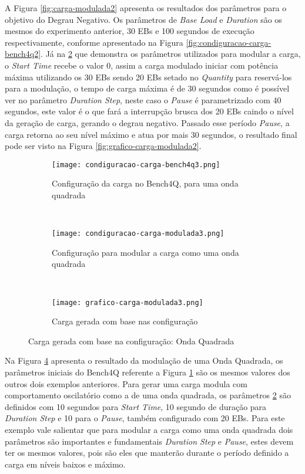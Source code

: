 A Figura \ref{fig:carga-modulada2} apresenta os resultados dos parâmetros para o objetivo do Degrau Negativo. Os parâmetros de \textit{Base Load} e \textit{Duration} são os mesmos do experimento anterior, 30 EBs e 100 segundos de execução respectivamente, conforme apresentado na Figura \ref{fig:condiguracao-carga-bench4q2}. Já na \ref{fig:condiguracao-carga-modulada3} que demonstra os parâmetros utilizados para modular a carga, o \textit{Start Time} recebe o valor 0, assim a carga modulado iniciar com potência máxima utilizando os 30 EBs sendo 20 EBs setado no \textit{Quantity} para reservá-los para a modulação, o tempo de carga máxima é de 30 segundos como é possível ver no parâmetro \textit{Duration Step}, neste caso o \textit{Pause} é parametrizado com 40 segundos, este valor é o que fará a interrupção brusca dos 20 EBs caindo o nível da geração de carga, gerando o degrau negativo. Passado esse período \textit{Pause}, a carga retorna ao seu nível máximo e atua por mais 30 segundos, o resultado final pode ser visto na Figura \ref{fig:grafico-carga-modulada2}. 

\begin{figure}[!htb]
	\begin{subfigure}{\linewidth}
		\centering
		\texttt{[image: condiguracao-carga-bench4q3.png]}
		\caption{Configuração da carga no Bench4Q, para uma onda quadrada}
		\label{fig:condiguracao-carga-bench4q3}
	\end{subfigure}\\
	\begin{subfigure}{\linewidth}
		\centering
		\texttt{[image: condiguracao-carga-modulada3.png]}
		\caption{Configuração para modular a carga como uma onda quadrada}
		\label{fig:condiguracao-carga-modulada3}
	\end{subfigure}\\[1ex]
	\begin{subfigure}{\linewidth}
		\centering
		\texttt{[image: grafico-carga-modulada3.png]}
		\caption{Carga gerada com base nas configuração}
		\label{fig:grafico-carga-modulada3}
	\end{subfigure}
	\caption{Carga gerada com base na configuração: Onda Quadrada}
	\label{fig:carga-modulada3}
	\fautor
\end{figure}

Na Figura \ref{fig:carga-modulada3} apresenta o resultado da modulação de uma Onda Quadrada, os parâmetros iniciais do Bench4Q referente a Figura \ref{fig:condiguracao-carga-bench4q3} são os mesmos valores dos outros dois exemplos anteriores. Para gerar uma carga modula com comportamento oscilatório como a de uma onda quadrada, os parâmetros \ref{fig:condiguracao-carga-modulada3} são definidos com 10 segundos para \textit{Start Time}, 10 segundo de duração para \textit{Duration Step} e 10 para o \textit{Pause}, também configurado com 20 EBs. Para este exemplo vale salientar que para modular a carga como uma onda quadrada dois parâmetros são importantes e fundamentais \textit{Duration Step} e \textit{Pause}, estes devem ter os mesmos valores, pois são eles que manterão durante o período definido a carga em níveis baixos e máximo. 

